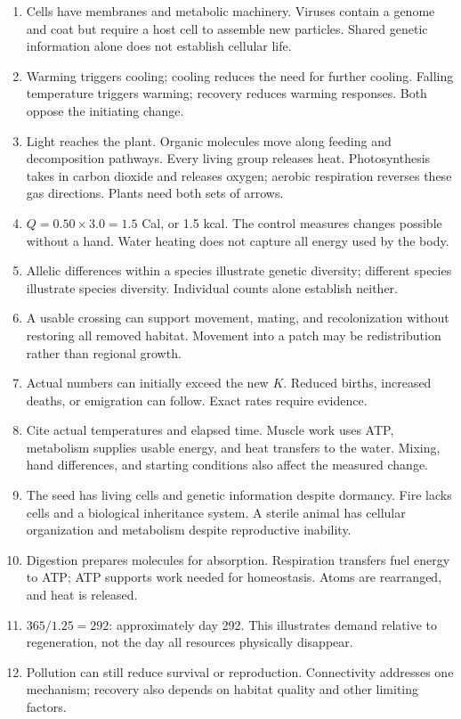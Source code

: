 \begin{enumerate}[itemsep=5pt]
\item Cells have membranes and metabolic machinery. Viruses contain a genome and coat but require a host cell to assemble new particles. Shared genetic information alone does not establish cellular life.
\item Warming triggers cooling; cooling reduces the need for further cooling. Falling temperature triggers warming; recovery reduces warming responses. Both oppose the initiating change.
\item Light reaches the plant. Organic molecules move along feeding and decomposition pathways. Every living group releases heat. Photosynthesis takes in carbon dioxide and releases oxygen; aerobic respiration reverses these gas directions. Plants need both sets of arrows.
\item $Q=0.50\times3.0=1.5$ Cal, or 1.5 kcal. The control measures changes possible without a hand. Water heating does not capture all energy used by the body.
\item Allelic differences within a species illustrate genetic diversity; different species illustrate species diversity. Individual counts alone establish neither.
\item A usable crossing can support movement, mating, and recolonization without restoring all removed habitat. Movement into a patch may be redistribution rather than regional growth.
\item Actual numbers can initially exceed the new $K$. Reduced births, increased deaths, or emigration can follow. Exact rates require evidence.
\item Cite actual temperatures and elapsed time. Muscle work uses ATP, metabolism supplies usable energy, and heat transfers to the water. Mixing, hand differences, and starting conditions also affect the measured change.
\item The seed has living cells and genetic information despite dormancy. Fire lacks cells and a biological inheritance system. A sterile animal has cellular organization and metabolism despite reproductive inability.
\item Digestion prepares molecules for absorption. Respiration transfers fuel energy to ATP; ATP supports work needed for homeostasis. Atoms are rearranged, and heat is released.
\item $365/1.25=292$: approximately day 292. This illustrates demand relative to regeneration, not the day all resources physically disappear.
\item Pollution can still reduce survival or reproduction. Connectivity addresses one mechanism; recovery also depends on habitat quality and other limiting factors.
\end{enumerate}
